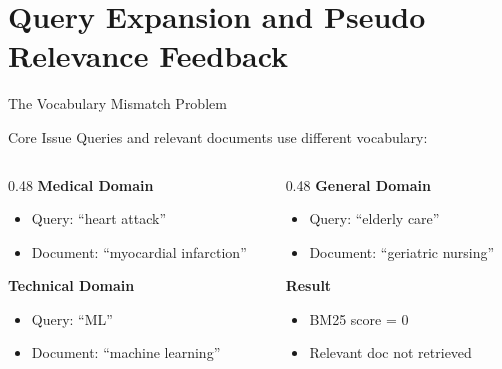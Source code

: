 \documentclass[aspectratio=169]{beamer}
\newif\ifanimated
\newcommand{\cpause}{\ifanimated\pause\fi}
\begin{document}
\section{Query Expansion and Pseudo Relevance Feedback}

\begin{frame}[plain]
\sectionpage
\end{frame}

\begin{frame}{The Vocabulary Mismatch Problem}
\begin{exampleblock}{Core Issue}
Queries and relevant documents use different vocabulary:
\end{exampleblock}

\vspace{1em}

\begin{columns}
\begin{column}{0.48\textwidth}
\textbf{Medical Domain}
\begin{itemize}
    \item Query: ``heart attack''
    \item Document: ``myocardial infarction''
\end{itemize}\cpause

\vspace{0.5em}

\textbf{Technical Domain}
\begin{itemize}
    \item Query: ``ML''
    \item Document: ``machine learning''
\end{itemize}\cpause
\end{column}

\begin{column}{0.48\textwidth}
\textbf{General Domain}
\begin{itemize}
    \item Query: ``elderly care''
    \item Document: ``geriatric nursing''
\end{itemize}\cpause

\vspace{0.5em}

\textbf{Result}
\begin{itemize}
    \item BM25 score = 0
    \item Relevant doc not retrieved
\end{itemize}\cpause
\end{column}
\end{columns}


\end{frame}
\end{document}
